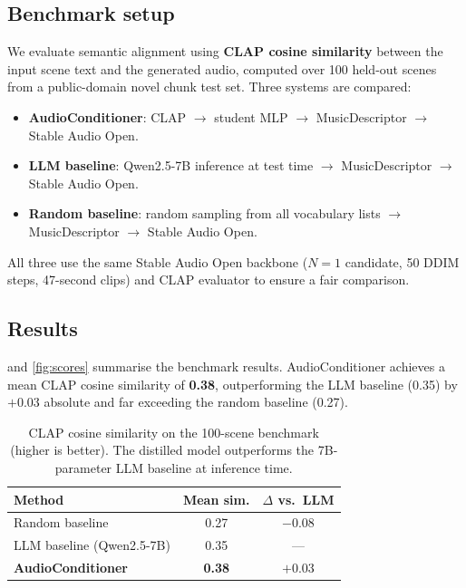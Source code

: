\documentclass[10pt,twocolumn,letterpaper]{article}
\begin{document}
\subsection{Benchmark setup}

We evaluate semantic alignment using \textbf{CLAP cosine similarity} between
the input scene text and the generated audio, computed over 100 held-out scenes
from a public-domain novel chunk test set.
Three systems are compared:

\begin{itemize}
  \item \textbf{AudioConditioner}: CLAP $\to$ student MLP $\to$ MusicDescriptor
        $\to$ Stable Audio Open.
  \item \textbf{LLM baseline}: Qwen2.5-7B inference at test time $\to$
        MusicDescriptor $\to$ Stable Audio Open.
  \item \textbf{Random baseline}: random sampling from all vocabulary lists
        $\to$ MusicDescriptor $\to$ Stable Audio Open.
\end{itemize}

All three use the same Stable Audio Open backbone ($N{=}1$ candidate, 50 DDIM
steps, 47-second clips) and CLAP evaluator to ensure a fair comparison.

\subsection{Results}

 and \cref{fig:scores} summarise the benchmark results.
AudioConditioner achieves a mean CLAP cosine similarity of \textbf{0.38},
outperforming the LLM baseline (0.35) by $+0.03$ absolute and far exceeding
the random baseline (0.27).

\begin{table}[t]
\caption{CLAP cosine similarity on the 100-scene benchmark (higher is better).
The distilled model outperforms the 7B-parameter LLM baseline at inference time.}
\label{tab:results}
\centering\small
\begin{tabular}{@{}lcc@{}}
\toprule
Method & Mean sim. & $\Delta$ vs.\ LLM \\
\midrule
Random baseline              & 0.27 & $-$0.08 \\
LLM baseline (Qwen2.5-7B)   & 0.35 & \phantom{$+$}--- \\
\textbf{AudioConditioner}    & \textbf{0.38} & $+$0.03 \\
\bottomrule
\end{tabular}
\end{table}
\end{document}

